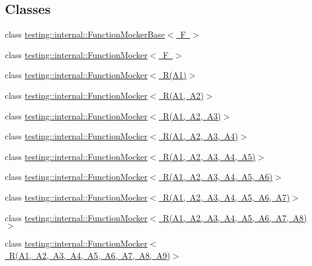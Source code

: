 \subsection*{Classes}
\begin{DoxyCompactItemize}
\item 
class \mbox{\hyperlink{classtesting_1_1internal_1_1_function_mocker_base}{testing\+::internal\+::\+Function\+Mocker\+Base$<$ F $>$}}
\item 
class \mbox{\hyperlink{classtesting_1_1internal_1_1_function_mocker}{testing\+::internal\+::\+Function\+Mocker$<$ F $>$}}
\item 
class \mbox{\hyperlink{classtesting_1_1internal_1_1_function_mocker_3_01_r_07_a1_08_4}{testing\+::internal\+::\+Function\+Mocker$<$ R(\+A1)$>$}}
\item 
class \mbox{\hyperlink{classtesting_1_1internal_1_1_function_mocker_3_01_r_07_a1_00_01_a2_08_4}{testing\+::internal\+::\+Function\+Mocker$<$ R(\+A1, A2)$>$}}
\item 
class \mbox{\hyperlink{classtesting_1_1internal_1_1_function_mocker_3_01_r_07_a1_00_01_a2_00_01_a3_08_4}{testing\+::internal\+::\+Function\+Mocker$<$ R(\+A1, A2, A3)$>$}}
\item 
class \mbox{\hyperlink{classtesting_1_1internal_1_1_function_mocker_3_01_r_07_a1_00_01_a2_00_01_a3_00_01_a4_08_4}{testing\+::internal\+::\+Function\+Mocker$<$ R(\+A1, A2, A3, A4)$>$}}
\item 
class \mbox{\hyperlink{classtesting_1_1internal_1_1_function_mocker_3_01_r_07_a1_00_01_a2_00_01_a3_00_01_a4_00_01_a5_08_4}{testing\+::internal\+::\+Function\+Mocker$<$ R(\+A1, A2, A3, A4, A5)$>$}}
\item 
class \mbox{\hyperlink{classtesting_1_1internal_1_1_function_mocker_3_01_r_07_a1_00_01_a2_00_01_a3_00_01_a4_00_01_a5_00_01_a6_08_4}{testing\+::internal\+::\+Function\+Mocker$<$ R(\+A1, A2, A3, A4, A5, A6)$>$}}
\item 
class \mbox{\hyperlink{classtesting_1_1internal_1_1_function_mocker_3_01_r_07_a1_00_01_a2_00_01_a3_00_01_a4_00_01_a5_00_01_a6_00_01_a7_08_4}{testing\+::internal\+::\+Function\+Mocker$<$ R(\+A1, A2, A3, A4, A5, A6, A7)$>$}}
\item 
class \mbox{\hyperlink{classtesting_1_1internal_1_1_function_mocker_3_01_r_07_a1_00_01_a2_00_01_a3_00_01_a4_00_01_a5_00_01_a6_00_01_a7_00_01_a8_08_4}{testing\+::internal\+::\+Function\+Mocker$<$ R(\+A1, A2, A3, A4, A5, A6, A7, A8)$>$}}
\item 
class \mbox{\hyperlink{classtesting_1_1internal_1_1_function_mocker_3_01_r_07_a1_00_01_a2_00_01_a3_00_01_a4_00_01_a5_00d00d8722bf1ad86ca8049508f133d393}{testing\+::internal\+::\+Function\+Mocker$<$ R(\+A1, A2, A3, A4, A5, A6, A7, A8, A9)$>$}}

\end{DoxyCompactItemize}
